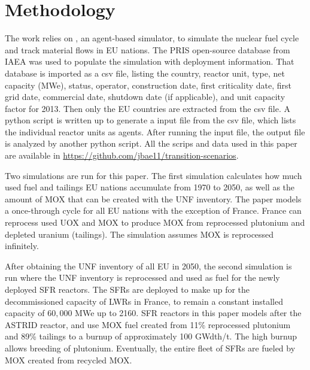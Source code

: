 \section{Methodology}
The work relies on \Cyclus, an agent-based simulator, to simulate the nuclear fuel cycle
and track material flows in \gls{EU} nations. The \gls{PRIS} open-source 
database from \gls{IAEA} was used to populate the simulation with deployment 
information. That database is imported as a csv file, listing the country, reactor unit, type, net capacity (MWe), status,
operator, construction date, first criticality date, first grid date, commercial date, shutdown
date (if applicable), and unit capacity factor for 2013. Then only the \gls{EU} countries are extracted
from the csv file. A python script is written up to generate a \Cyclus input file from the csv file,
which lists the individual reactor units as agents. After running the \Cyclus input file,
the output file is analyzed by another python script. All the scrips and data used
in this paper are available in \url{https://github.com/jbae11/transition-scenarios}.

Two \Cyclus simulations are run for this paper. 
The first simulation calculates
how much used fuel and tailings \gls{EU} nations accumulate from 1970 to 2050,
as well as the amount of \gls{MOX} that can be created with the \gls{UNF} inventory.
The paper models a once-through cycle for all 
\gls{EU} nations with the exception of France. France can reprocess used \gls{UOX} and \gls{MOX} to
produce \gls{MOX} from reprocessed plutonium and depleted uranium (tailings).
The simulation assumes \gls{MOX} is reprocessed infinitely. 


After obtaining the \gls{UNF} inventory of all \gls{EU} in 2050, the second
simulation is run where the \gls{UNF} inventory is reprocessed and
used as fuel for the newly deployed \gls{SFR} reactors.
The \glspl{SFR} are deployed to make up for the decommissioned capacity
of \glspl{LWR} in France, to remain a constant installed capacity of $60,000$ MWe up to 2160.
\gls{SFR} reactors in this paper models after the ASTRID reactor,
and use \gls{MOX} fuel created from 11\% reprocessed plutonium
and 89\% tailings to a burnup
of approximately 100 GWdth/t. The high burnup allows breeding of plutonium.
Eventually, the entire fleet
of \glspl{SFR} are fueled by \gls{MOX} created from recycled \gls{MOX}.


